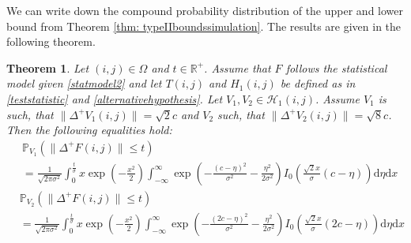 \documentclass[a4paper,12pt]{article}
\newcommand{\norm}[1]{\lVert#1\rVert}
\theoremstyle{plain}
\newtheorem{theorem}{Theorem}[section]
\theoremstyle{definition}
\begin{document}
We can write down the compound probability distribution of the upper and lower bound from Theorem \ref{thm: typeIIboundssimulation}. The results are given in the following theorem.

\begin{theorem}\label{thm: typeIIboundsintegration}
	Let $(i, j) \in \Omega$ and $t \in \mathbb{R}^+$. Assume that $F$ follows the statistical model given \eqref{statmodel2} and let $T(i, j)$ and $H_1(i, j)$ be defined as in \eqref{teststatistic} and \eqref{alternativehypothesis}. Let $V_1, V_2 \in \mathcal{H}_1(i, j)$. Assume $V_1$ is such, that $\norm{\Delta^+ V_1(i, j)} = \sqrt{2} c$ and $V_2$ such, that $\norm{\Delta^+ V_2(i, j)} = \sqrt{8} c$. Then the following equalities hold:
	\begin{equation}\label{eq: typeIIupperboundintegration}
		\begin{aligned}
			&\mathbb{P}_{V_1}\left( \norm{\Delta^+ F(i, j)} \leq t \right) \\
			&= \frac{1}{\sqrt{2 \pi \sigma^2}} \int_0^\frac{t}{\sigma} x \exp \left( - \frac{x^2}{2} \right) \int_{-\infty}^\infty \exp \left( - \frac{(c - \eta)^2}{\sigma^2} - \frac{\eta^2}{2 \sigma^2} \right) I_0 \left( \frac{\sqrt{2} x}{\sigma} (c - \eta) \right) \mathrm{d}\eta \mathrm{d}x
		\end{aligned}
	\end{equation}
	\begin{equation}\label{eq: typeIIlowerboundintegration}
		\begin{aligned}
			&\mathbb{P}_{V_2}\left( \norm{\Delta^+ F(i, j)} \leq t \right) \\
			&= \frac{1}{\sqrt{2 \pi \sigma^2}} \int_0^\frac{t}{\sigma} x \exp \left( - \frac{x^2}{2} \right) \int_{-\infty}^\infty \exp \left( - \frac{(2 c - \eta)^2}{\sigma^2} - \frac{\eta^2}{2 \sigma^2} \right) I_0 \left( \frac{\sqrt{2} x}{\sigma} (2 c - \eta) \right) \mathrm{d}\eta \mathrm{d}x
		\end{aligned}
	\end{equation}
\end{theorem}
\end{document}

